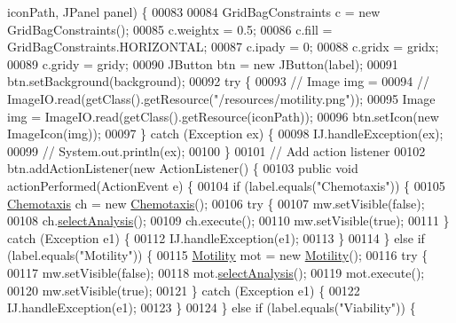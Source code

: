 \begin{DoxyCode}
      iconPath, JPanel panel) \{
00083 
00084     GridBagConstraints c = \textcolor{keyword}{new} GridBagConstraints();
00085     c.weightx = 0.5;
00086     c.fill = GridBagConstraints.HORIZONTAL;
00087     c.ipady = 0;
00088     c.gridx = gridx;
00089     c.gridy = gridy;
00090     JButton btn = \textcolor{keyword}{new} JButton(label);
00091     btn.setBackground(background);
00092     \textcolor{keywordflow}{try} \{
00093       \textcolor{comment}{// Image img =}
00094       \textcolor{comment}{// ImageIO.read(getClass().getResource("/resources/motility.png"));}
00095       Image img = ImageIO.read(getClass().getResource(iconPath));
00096       btn.setIcon(\textcolor{keyword}{new} ImageIcon(img));
00097     \} \textcolor{keywordflow}{catch} (Exception ex) \{
00098       IJ.handleException(ex);
00099 \textcolor{comment}{//      System.out.println(ex);}
00100     \}
00101     \textcolor{comment}{// Add action listener}
00102     btn.addActionListener(\textcolor{keyword}{new} ActionListener() \{
00103       \textcolor{keyword}{public} \textcolor{keywordtype}{void} actionPerformed(ActionEvent e) \{
00104         \textcolor{keywordflow}{if} (label.equals(\textcolor{stringliteral}{"Chemotaxis"})) \{
00105           \hyperlink{classanalysis_1_1_chemotaxis}{Chemotaxis} ch = \textcolor{keyword}{new} \hyperlink{classanalysis_1_1_chemotaxis}{Chemotaxis}();
00106           \textcolor{keywordflow}{try} \{
00107             mw.setVisible(\textcolor{keyword}{false});
00108             ch.\hyperlink{classanalysis_1_1_chemotaxis_aef66a58ab7f95817a68a3429550562fc}{selectAnalysis}();
00109             ch.execute();
00110             mw.setVisible(\textcolor{keyword}{true});
00111           \} \textcolor{keywordflow}{catch} (Exception e1) \{
00112             IJ.handleException(e1);
00113           \}
00114         \} \textcolor{keywordflow}{else} \textcolor{keywordflow}{if} (label.equals(\textcolor{stringliteral}{"Motility"})) \{
00115           \hyperlink{classanalysis_1_1_motility}{Motility} mot = \textcolor{keyword}{new} \hyperlink{classanalysis_1_1_motility}{Motility}();
00116           \textcolor{keywordflow}{try} \{
00117             mw.setVisible(\textcolor{keyword}{false});
00118             mot.\hyperlink{classanalysis_1_1_motility_aef66a58ab7f95817a68a3429550562fc}{selectAnalysis}();
00119             mot.execute();
00120             mw.setVisible(\textcolor{keyword}{true});
00121           \} \textcolor{keywordflow}{catch} (Exception e1) \{
00122             IJ.handleException(e1);
00123           \}          
00124         \} \textcolor{keywordflow}{else} \textcolor{keywordflow}{if} (label.equals(\textcolor{stringliteral}{"Viability"})) \{

\end{DoxyCode}
